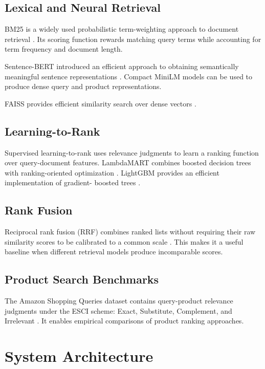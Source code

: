 \documentclass[conference]{IEEEtran}
\begin{document}
\subsection{Lexical and Neural Retrieval}

BM25 is a widely used probabilistic
term-weighting approach to document
retrieval \cite{robertson}.
Its scoring function rewards matching
query terms while accounting for term
frequency and document length.

Sentence-BERT introduced an efficient
approach to obtaining semantically
meaningful sentence representations
\cite{reimers}. Compact MiniLM models
can be used to produce dense query and
product representations.

FAISS provides efficient similarity
search over dense vectors
\cite{johnson}.

\subsection{Learning-to-Rank}

Supervised learning-to-rank uses relevance
judgments to learn a ranking function
over query-document features. LambdaMART
combines boosted decision trees with
ranking-oriented optimization
\cite{burges}. LightGBM provides an
efficient implementation of gradient-
boosted trees \cite{ke}.

\subsection{Rank Fusion}

Reciprocal rank fusion (RRF) combines
ranked lists without requiring their
raw similarity scores to be calibrated
to a common scale \cite{cormack}.
This makes it a useful baseline when
different retrieval models produce
incomparable scores.

\subsection{Product Search Benchmarks}

The Amazon Shopping Queries dataset
contains query-product relevance
judgments under the ESCI scheme:
Exact, Substitute, Complement, and
Irrelevant \cite{reddy}. It enables
empirical comparisons of product
ranking approaches.

\section{System Architecture}
\end{document}
